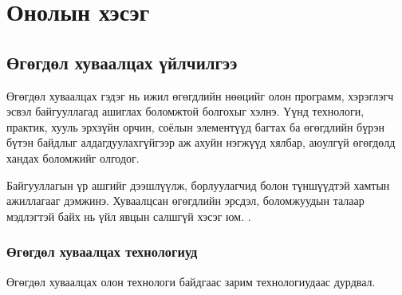 \chapter{Онолын хэсэг}
\label{Chapter1}
\pagecolor{white}

\newcommand{\keyword}[1]{\textbf{#1}}
\newcommand{\tabhead}[1]{\textbf{#1}}
\newcommand{\code}[1]{\texttt{#1}}
\newcommand{\file}[1]{\texttt{\bfseries#1}}
\newcommand{\option}[1]{\texttt{\itshape#1}}


\section{Өгөгдөл хуваалцах үйлчилгээ}
Өгөгдөл хуваалцах гэдэг нь ижил өгөгдлийн нөөцийг олон программ, хэрэглэгч эсвэл байгууллагад ашиглах боломжтой болгохыг хэлнэ.
Үүнд технологи, практик, хууль эрхзүйн орчин, соёлын элементүүд багтах ба өгөгдлийн бүрэн бүтэн байдлыг алдагдуулахгүйгээр аж ахуйн нэгжүүд хялбар, аюулгүй өгөгдөлд хандах боломжийг олгодог.

Байгууллагын үр ашгийг дээшлүүлж, борлуулагчид болон түншүүдтэй хамтын ажиллагааг дэмжинэ. Хуваалцсан өгөгдлийн эрсдэл, боломжуудын талаар мэдлэгтэй байх нь үйл явцын салшгүй хэсэг юм.
\cite{AWSDataSharing}.

\subsection*{Өгөгдөл хуваалцах технологиуд}
Өгөгдөл хуваалцах олон технологи байдгаас зарим технологиудаас дурдвал.

